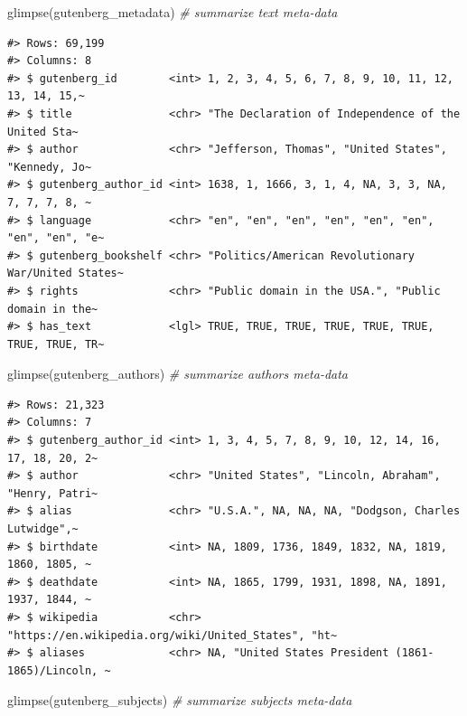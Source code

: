 \documentclass[
  letterpaper,
]{scrbook}
\newenvironment{Shaded}{\begin{snugshade}}{\end{snugshade}}
\newcommand{\CommentTok}[1]{\textcolor[rgb]{0.00,0.00,0.00}{\textit{#1}}}
\newcommand{\FunctionTok}[1]{\textcolor[rgb]{0.00,0.00,0.00}{#1}}
\newcommand{\NormalTok}[1]{\textcolor[rgb]{0.00,0.00,0.00}{#1}}
\begin{document}
\begin{Shaded}
\begin{Highlighting}[]
\FunctionTok{glimpse}\NormalTok{(gutenberg\_metadata) }\CommentTok{\# summarize text meta{-}data}
\end{Highlighting}
\end{Shaded}

\begin{verbatim}
#> Rows: 69,199
#> Columns: 8
#> $ gutenberg_id        <int> 1, 2, 3, 4, 5, 6, 7, 8, 9, 10, 11, 12, 13, 14, 15,~
#> $ title               <chr> "The Declaration of Independence of the United Sta~
#> $ author              <chr> "Jefferson, Thomas", "United States", "Kennedy, Jo~
#> $ gutenberg_author_id <int> 1638, 1, 1666, 3, 1, 4, NA, 3, 3, NA, 7, 7, 7, 8, ~
#> $ language            <chr> "en", "en", "en", "en", "en", "en", "en", "en", "e~
#> $ gutenberg_bookshelf <chr> "Politics/American Revolutionary War/United States~
#> $ rights              <chr> "Public domain in the USA.", "Public domain in the~
#> $ has_text            <lgl> TRUE, TRUE, TRUE, TRUE, TRUE, TRUE, TRUE, TRUE, TR~
\end{verbatim}

\begin{Shaded}
\begin{Highlighting}[]
\FunctionTok{glimpse}\NormalTok{(gutenberg\_authors) }\CommentTok{\# summarize authors meta{-}data}
\end{Highlighting}
\end{Shaded}

\begin{verbatim}
#> Rows: 21,323
#> Columns: 7
#> $ gutenberg_author_id <int> 1, 3, 4, 5, 7, 8, 9, 10, 12, 14, 16, 17, 18, 20, 2~
#> $ author              <chr> "United States", "Lincoln, Abraham", "Henry, Patri~
#> $ alias               <chr> "U.S.A.", NA, NA, NA, "Dodgson, Charles Lutwidge",~
#> $ birthdate           <int> NA, 1809, 1736, 1849, 1832, NA, 1819, 1860, 1805, ~
#> $ deathdate           <int> NA, 1865, 1799, 1931, 1898, NA, 1891, 1937, 1844, ~
#> $ wikipedia           <chr> "https://en.wikipedia.org/wiki/United_States", "ht~
#> $ aliases             <chr> NA, "United States President (1861-1865)/Lincoln, ~
\end{verbatim}

\begin{Shaded}
\begin{Highlighting}[]
\FunctionTok{glimpse}\NormalTok{(gutenberg\_subjects) }\CommentTok{\# summarize subjects meta{-}data}
\end{Highlighting}
\end{Shaded}
\end{document}
